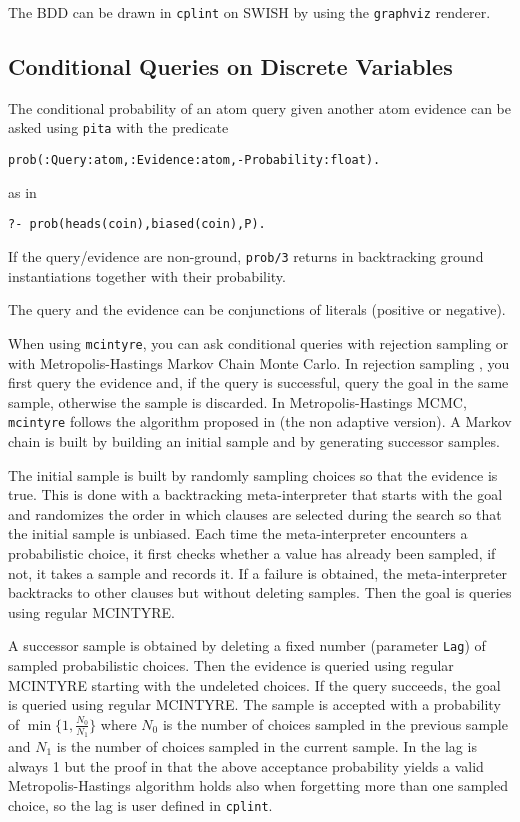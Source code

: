 The BDD can be drawn in \verb|cplint| on SWISH by using the \verb|graphviz| renderer.


\subsection{Conditional Queries on Discrete Variables}
\label{condq}
The conditional probability of an atom query given another atom evidence can be asked using \verb|pita| with the predicate 
\begin{verbatim}
prob(:Query:atom,:Evidence:atom,-Probability:float).
\end{verbatim}
as in
\begin{verbatim}
?- prob(heads(coin),biased(coin),P).
\end{verbatim}
If the query/evidence are non-ground, \verb|prob/3| returns in backtracking ground instantiations together with their probability.

The query and the evidence can be conjunctions of literals (positive or negative).

When using \verb|mcintyre|, you can ask conditional queries with rejection sampling or with Metropolis-Hastings Markov Chain Monte Carlo.
In rejection sampling \cite{von195113}, you first query the evidence and, if the query is successful, query the goal in the same sample, otherwise
the sample is discarded.
In Metropolis-Hastings MCMC, \verb|mcintyre| follows the algorithm proposed in \cite{nampally2014adaptive} (the non adaptive version).
A Markov chain is built by building an initial sample and by generating successor samples.

The initial sample is built by  randomly sampling choices so that the evidence is true. This is done with
a backtracking meta-interpreter that starts with the goal and
randomizes the order in which clauses are selected during the search so that the initial sample is unbiased. Each time the meta-interpreter encounters 
a probabilistic choice, it first checks whether a
value has already been sampled, if not, it takes
a sample and records it. If a failure is obtained,
the meta-interpreter backtracks to other clauses but
without deleting samples. Then the goal is queries using 
regular MCINTYRE.

A successor sample is obtained by deleting a 
fixed number (parameter \verb|Lag|) of sampled probabilistic choices. Then the
evidence is queried using regular MCINTYRE starting with the undeleted choices.
If the query succeeds, the goal is queried using regular MCINTYRE.
The sample is accepted with a probability of $\min\{1,\frac{N_0}{N_1}\}$ where $N_0$ is the number of choices sampled
in the previous sample and $N_1$ is the number of choices sampled in the current sample.
In \cite{nampally2014adaptive} the lag is always 1 but the proof in \cite{nampally2014adaptive} that the above acceptance
probability yields a valid
Metropolis-Hastings algorithm holds also when forgetting more than one 
sampled choice, so the lag is 
user defined in \verb|cplint|.


